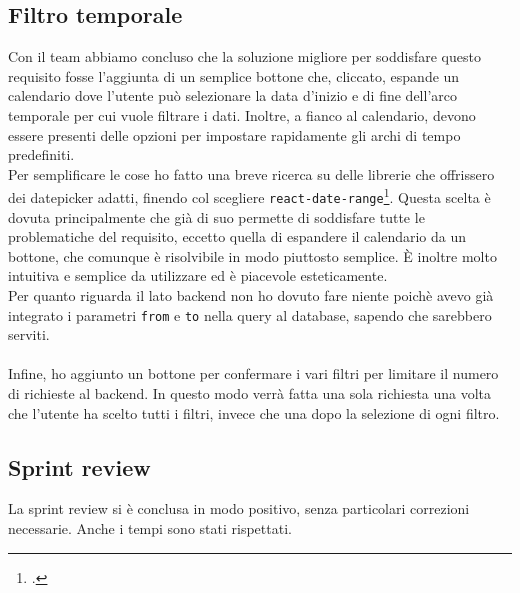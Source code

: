 \subsection{Filtro temporale}
Con il team abbiamo concluso che la soluzione migliore per soddisfare questo requisito fosse l'aggiunta di un semplice bottone che, cliccato, espande un calendario dove l'utente può selezionare la data d'inizio e di fine dell'arco temporale per cui vuole filtrare i dati. Inoltre, a fianco al calendario, devono essere presenti delle opzioni per impostare rapidamente gli archi di tempo predefiniti. \\
Per semplificare le cose ho fatto una breve ricerca su delle librerie che offrissero dei datepicker adatti, finendo col scegliere \texttt{react-date-range}\footcite{site:rdr}. Questa scelta è dovuta principalmente che già di suo permette di soddisfare tutte le problematiche del requisito, eccetto quella di espandere il calendario da un bottone, che comunque è risolvibile in modo piuttosto semplice. È inoltre molto intuitiva e semplice da utilizzare ed è piacevole esteticamente.\\
Per quanto riguarda il lato backend non ho dovuto fare niente poichè avevo già integrato i parametri \texttt{from} e \texttt{to} nella query al database, sapendo che sarebbero serviti.\\\\
Infine, ho aggiunto un bottone per confermare i vari filtri per limitare il numero di richieste al backend. In questo modo verrà fatta una sola richiesta una volta che l'utente ha scelto tutti i filtri, invece che una dopo la selezione di ogni filtro.

\subsection{Sprint review}
La sprint review si è conclusa in modo positivo, senza particolari correzioni necessarie. Anche i tempi sono stati rispettati.
